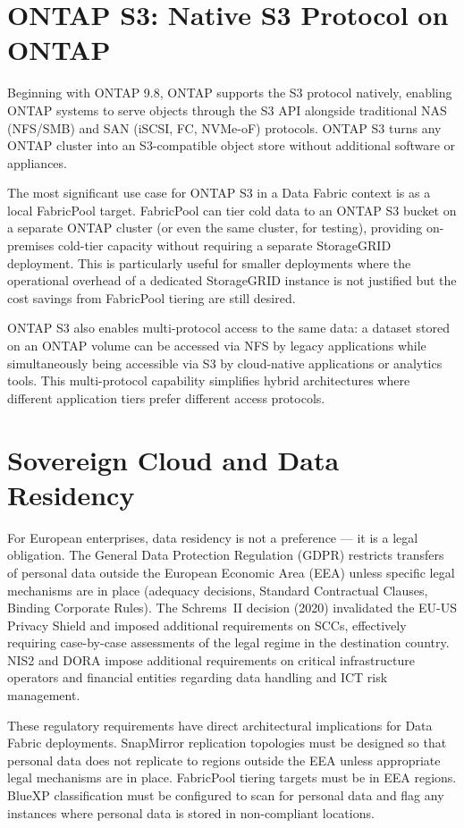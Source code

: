 \section{ONTAP S3: Native S3 Protocol on ONTAP}

Beginning with ONTAP 9.8, ONTAP supports the S3 protocol natively, enabling
ONTAP systems to serve objects through the S3 API alongside traditional NAS
(NFS/SMB) and SAN (iSCSI, FC, NVMe-oF) protocols. ONTAP S3 turns any ONTAP
cluster into an S3-compatible object store without additional software or
appliances.

The most significant use case for ONTAP S3 in a Data Fabric context is as a
local FabricPool target. FabricPool can tier cold data to an ONTAP S3 bucket
on a separate ONTAP cluster (or even the same cluster, for testing), providing
on-premises cold-tier capacity without requiring a separate StorageGRID
deployment. This is particularly useful for smaller deployments where the
operational overhead of a dedicated StorageGRID instance is not justified but
the cost savings from FabricPool tiering are still desired.

ONTAP S3 also enables multi-protocol access to the same data: a dataset
stored on an ONTAP volume can be accessed via NFS by legacy applications while
simultaneously being accessible via S3 by cloud-native applications or
analytics tools. This multi-protocol capability simplifies hybrid
architectures where different application tiers prefer different access
protocols.

\section{Sovereign Cloud and Data Residency}

For European enterprises, data residency is not a preference --- it is a legal
obligation. The General Data Protection Regulation (GDPR) restricts transfers
of personal data outside the European Economic Area (EEA) unless specific
legal mechanisms are in place (adequacy decisions, Standard Contractual
Clauses, Binding Corporate Rules). The Schrems~II decision (2020) invalidated
the EU-US Privacy Shield and imposed additional requirements on SCCs,
effectively requiring case-by-case assessments of the legal regime in the
destination country. NIS2 and DORA impose additional requirements on critical
infrastructure operators and financial entities regarding data handling and
ICT risk management.

These regulatory requirements have direct architectural implications for Data
Fabric deployments. SnapMirror replication topologies must be designed so that
personal data does not replicate to regions outside the EEA unless appropriate
legal mechanisms are in place. FabricPool tiering targets must be in EEA
regions. BlueXP classification must be configured to scan for personal data
and flag any instances where personal data is stored in non-compliant
locations.


